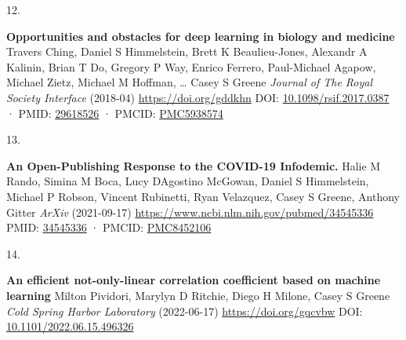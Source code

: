 \documentclass[
]{article}
\newlength{\cslhangindent}
\newlength{\csllabelwidth}
\newlength{\cslentryspacingunit} %
\newenvironment{CSLReferences}[2] %
 {%
  \setlength{\parindent}{0pt}
  \ifodd #1
  \let\oldpar\par
  \def\par{\hangindent=\cslhangindent\oldpar}
  \fi
  \setlength{\parskip}{#2\cslentryspacingunit}
 }%
 {}
\newcommand{\CSLBlock}[1]{#1\hfill\break}
\newcommand{\CSLLeftMargin}[1]{\parbox[t]{\csllabelwidth}{#1}}
\newcommand{\CSLRightInline}[1]{\parbox[t]{\linewidth - \csllabelwidth}{#1}\break}
\providecommand{\DIFaddbegin}{} %
\providecommand{\DIFaddend}{} %
\providecommand{\DIFdelbegin}{} %
\providecommand{\DIFdelend}{} %
\newcommand{\DIFscaledelfig}{0.5}
\newlength{\DIFdelgraphicswidth} %
\newlength{\DIFdelgraphicsheight} %
\newcommand{\DIFaddincludegraphics}[2][]{{\color{blue}\fbox{\DIFOincludegraphics[#1]{#2}}}} %
\newcommand{\DIFdelincludegraphics}[2][]{%
\sbox{\DIFdelgraphicsbox}{\DIFOincludegraphics[#1]{#2}}%
\settoboxwidth{\DIFdelgraphicswidth}{\DIFdelgraphicsbox} %
\settoboxtotalheight{\DIFdelgraphicsheight}{\DIFdelgraphicsbox} %
\scalebox{\DIFscaledelfig}{%
\parbox[b]{\DIFdelgraphicswidth}{\usebox{\DIFdelgraphicsbox}\\[-\baselineskip] \rule{\DIFdelgraphicswidth}{0em}}\llap{\resizebox{\DIFdelgraphicswidth}{\DIFdelgraphicsheight}{%
\setlength{\unitlength}{\DIFdelgraphicswidth}%
\begin{picture}(1,1)%
\thicklines\linethickness{2pt} %
{\color[rgb]{1,0,0}\put(0,0){\framebox(1,1){}}}%
{\color[rgb]{1,0,0}\put(0,0){\line( 1,1){1}}}%
{\color[rgb]{1,0,0}\put(0,1){\line(1,-1){1}}}%
\end{picture}%
}\hspace*{3pt}}} %
} %
\DeclareRobustCommand{\DIFaddbegin}{\DIFOaddbegin \let\includegraphics\DIFaddincludegraphics} %
\DeclareRobustCommand{\DIFaddend}{\DIFOaddend \let\includegraphics\DIFOincludegraphics} %
\DeclareRobustCommand{\DIFdelbegin}{\DIFOdelbegin \let\includegraphics\DIFdelincludegraphics} %
\DeclareRobustCommand{\DIFdelend}{\DIFOaddend \let\includegraphics\DIFOincludegraphics} %
\begin{document}
\begin{CSLReferences}{0}{0}
\leavevmode{}%
\DIFdelbegin %
\DIFdelend \DIFaddbegin \CSLLeftMargin{12. }\DIFaddend %
\CSLRightInline{\textbf{Opportunities and obstacles for deep learning in biology and medicine}
\CSLBlock{Travers Ching, Daniel S Himmelstein, Brett K Beaulieu-Jones, Alexandr A Kalinin, Brian T Do, Gregory P Way, Enrico Ferrero, Paul-Michael Agapow, Michael Zietz, Michael M Hoffman, \ldots{} Casey S Greene} \emph{Journal of The Royal Society Interface} (2018-04) \url{https://doi.org/gddkhn}
\CSLBlock{DOI: \href{https://doi.org/10.1098/rsif.2017.0387}{10.1098/rsif.2017.0387} · PMID: \href{https://www.ncbi.nlm.nih.gov/pubmed/29618526}{29618526} · PMCID: \href{https://www.ncbi.nlm.nih.gov/pmc/articles/PMC5938574}{PMC5938574}}}

\leavevmode{}%
\DIFdelbegin %
\DIFdelend \DIFaddbegin \CSLLeftMargin{13. }\DIFaddend %
\CSLRightInline{\textbf{An Open-Publishing Response to the COVID-19 Infodemic.}
\CSLBlock{Halie M Rando, Simina M Boca, Lucy D\textquotesingle Agostino McGowan, Daniel S Himmelstein, Michael P Robson, Vincent Rubinetti, Ryan Velazquez, Casey S Greene, Anthony Gitter} \emph{ArXiv} (2021-09-17) \url{https://www.ncbi.nlm.nih.gov/pubmed/34545336}
\CSLBlock{PMID: \href{https://www.ncbi.nlm.nih.gov/pubmed/34545336}{34545336} · PMCID: \href{https://www.ncbi.nlm.nih.gov/pmc/articles/PMC8452106}{PMC8452106}}}

\leavevmode{}%
\DIFdelbegin %
\DIFdelend \DIFaddbegin \CSLLeftMargin{14. }\DIFaddend %
\CSLRightInline{\textbf{An efficient not-only-linear correlation coefficient based on machine learning}
\CSLBlock{Milton Pividori, Marylyn D Ritchie, Diego H Milone, Casey S Greene} \emph{Cold Spring Harbor Laboratory} (2022-06-17) \url{https://doi.org/gqcvbw}
\CSLBlock{DOI: \href{https://doi.org/10.1101/2022.06.15.496326}{10.1101/2022.06.15.496326}}}


\end{CSLReferences}
\end{document}
